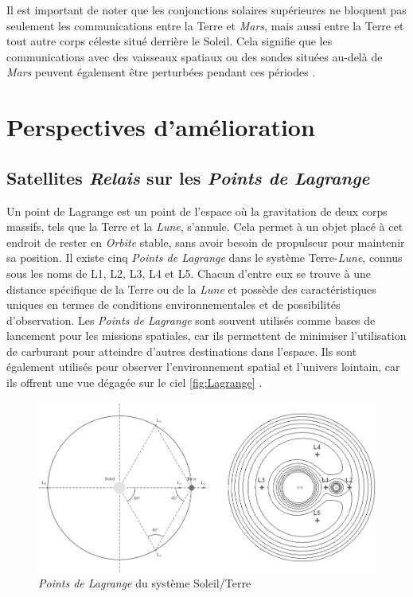 \documentclass[conference]{IEEEtran}
\begin{document}
Il est important de noter que les conjonctions solaires supérieures ne bloquent pas seulement les communications entre la Terre et \emph{Mars}, mais aussi entre la Terre et tout autre corps céleste situé derrière le Soleil. Cela signifie que les communications avec des vaisseaux spatiaux ou des sondes situées au-delà de \emph{Mars} peuvent également être perturbées pendant ces périodes \cite{b10}.


\section{Perspectives d'amélioration}
\subsection{Satellites \emph{Relais} sur les \emph{Points de Lagrange}}
\label{sec:SRPL}
Un point de Lagrange est un point de l'espace où la gravitation de deux corps massifs, tels que la Terre et la \emph{Lune}, s'annule. Cela permet à un objet placé à cet endroit de rester en \emph{Orbite} stable, sans avoir besoin de propulseur pour maintenir sa position.
Il existe cinq \emph{Points de Lagrange} dans le système Terre-\emph{Lune}, connus sous les noms de L1, L2, L3, L4 et L5. Chacun d'entre eux se trouve à une distance spécifique de la Terre ou de la \emph{Lune} et possède des caractéristiques uniques en termes de conditions environnementales et de possibilités d'observation.
Les \emph{Points de Lagrange} sont souvent utilisés comme bases de lancement pour les missions spatiales, car ils permettent de minimiser l'utilisation de carburant pour atteindre d'autres destinations dans l'espace. Ils sont également utilisés pour observer l'environnement spatial et l'univers lointain, car ils offrent une vue dégagée sur le ciel \autoref{fig:Lagrange} \cite{b10}.

\begin{figure}[htbp]
\centerline{\includegraphics[scale=1.26]{Image4.png}}
\caption{\emph{Points de Lagrange} du système Soleil/Terre \cite{b11}}
\label{fig:Lagrange}
\end{figure}
\end{document}
